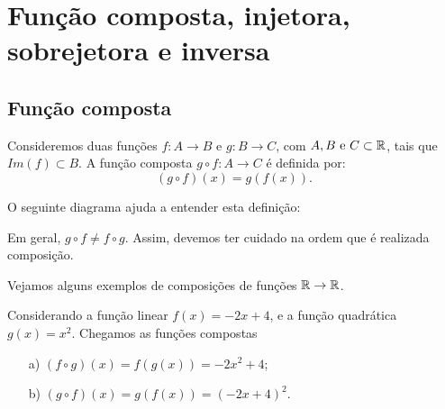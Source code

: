 
\chapter{Função composta, injetora, sobrejetora e inversa}

\section{Função composta}

\begin{obs}
Consideremos duas funções $f: A \rightarrow B$ e $g: B \rightarrow C$, com $A, B \text{ e } C \subset \mathbb{R}$, tais que $Im(f) \subset B$. A função composta $g \circ f: A \rightarrow C$ é definida por:
\begin{equation*}
(g \circ f)(x)= g(f(x)). 
\end{equation*}

O seguinte diagrama ajuda a entender esta definição:

\begin{center}
\end{center}
\end{obs}


Em geral, $g\circ f \neq f\circ g$. Assim, devemos ter cuidado na ordem que é realizada composição.

Vejamos alguns exemplos de composições de funções $\mathbb{R} \to \mathbb{R}$.

\begin{exem}
Considerando a função linear $f(x)= -2x+4$, e a função quadrática $g(x)= x^2$. Chegamos as funções compostas 
\begin{enumerate}
\item [a)] $(f \circ g)(x)= f(g(x))= -2x^2 + 4$;
\item [b)] $(g \circ f)(x)= g(f(x))= (-2x+4)^2$.
\end{enumerate}
\end{exem}

